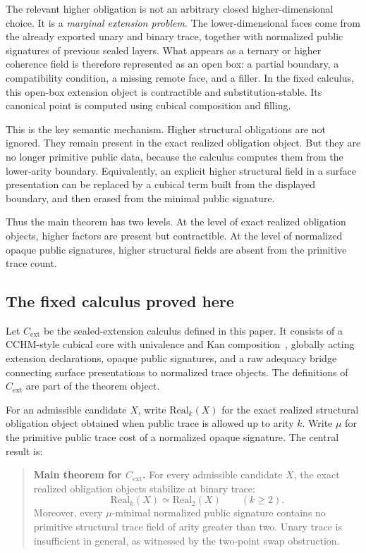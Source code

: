 \documentclass{lmcs}
\begin{document}
The relevant higher obligation is not an arbitrary closed higher-dimensional
choice.  It is a \emph{marginal extension problem}.  The lower-dimensional faces
come from the already exported unary and binary trace, together with normalized
public signatures of previous sealed layers.  What appears as a ternary or higher
coherence field is therefore represented as an open box: a partial boundary, a
compatibility condition, a missing remote face, and a filler.  In the fixed
calculus, this open-box extension object is contractible and substitution-stable.
Its canonical point is computed using cubical composition and filling.

This is the key semantic mechanism.  Higher structural obligations are not
ignored.  They remain present in the exact realized obligation object.  But they
are no longer primitive public data, because the calculus computes them from the
lower-arity boundary.  Equivalently, an explicit higher structural field in a
surface presentation can be replaced by a cubical term built from the displayed
boundary, and then erased from the minimal public signature.

Thus the main theorem has two levels.  At the level of exact realized obligation
objects, higher factors are present but contractible.  At the level of normalized
opaque public signatures, higher structural fields are absent from the primitive
trace count.

\subsection{The fixed calculus proved here}

Let \(C_{\mathrm{ext}}\) be the sealed-extension calculus defined in this paper.
It consists of a CCHM-style cubical core with univalence and Kan
composition~\cite{cubical}, globally acting extension declarations, opaque
public signatures, and a raw adequacy bridge connecting surface presentations to
normalized trace objects.  The definitions of \(C_{\mathrm{ext}}\) are part of
the theorem object.

For an admissible candidate \(X\), write \(\mathrm{Real}_k(X)\) for the exact
realized structural obligation object obtained when public trace is allowed up
to arity \(k\).  Write \(\mu\) for the primitive public trace cost of a normalized
opaque signature.  The central result is:
\begin{quote}
\textbf{Main theorem for \(C_{\mathrm{ext}}\).}
For every admissible candidate \(X\), the exact realized obligation objects
stabilize at binary trace:
\[
  \mathrm{Real}_k(X) \simeq \mathrm{Real}_2(X)
  \qquad (k \geq 2).
\]
Moreover, every \(\mu\)-minimal normalized public signature contains no primitive
structural trace field of arity greater than two.  Unary trace is insufficient in
general, as witnessed by the two-point swap obstruction.
\end{quote}
\end{document}
